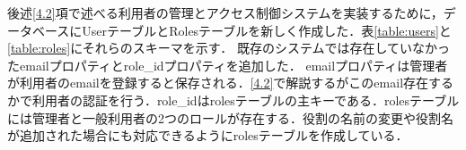 後述\ref{4.2}項で述べる利用者の管理とアクセス制御システムを実装するために，データベースにUserテーブルとRolesテーブルを新しく作成した．表\ref{table:users}と\ref{table:roles}にそれらのスキーマを示す．
既存のシステムでは存在していなかったemailプロパティとrole\_idプロパティを追加した．
emailプロパティは管理者が利用者のemailを登録すると保存される．\ref{4.2}で解説するがこのemail存在するかで利用者の認証を行う．role\_idはrolesテーブルの主キーである．rolesテーブルには管理者と一般利用者の2つのロールが存在する．役割の名前の変更や役割名が追加された場合にも対応できるようにrolesテーブルを作成している．



\begin{table}[]
  \caption{Usersテーブル}
  \centering
    \label{table:users}
\end{table}


\begin{table}[]
  \caption{Rolesテーブル}
  \centering
  \label{table:roles}
\end{table}


